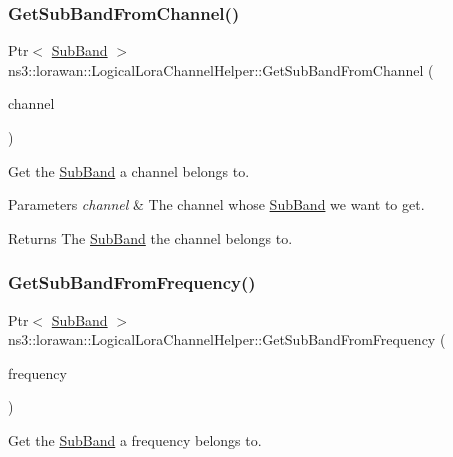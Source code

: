 \subsubsection{\texorpdfstring{Get\+Sub\+Band\+From\+Channel()}{GetSubBandFromChannel()}}
{\footnotesize\ttfamily Ptr$<$ \hyperlink{classns3_1_1lorawan_1_1SubBand}{Sub\+Band} $>$ ns3\+::lorawan\+::\+Logical\+Lora\+Channel\+Helper\+::\+Get\+Sub\+Band\+From\+Channel (\begin{DoxyParamCaption}\item[{Ptr$<$ \hyperlink{classns3_1_1lorawan_1_1LogicalLoraChannel}{Logical\+Lora\+Channel} $>$}]{channel }\end{DoxyParamCaption})}

Get the \hyperlink{classns3_1_1lorawan_1_1SubBand}{Sub\+Band} a channel belongs to.


\begin{DoxyParams}{Parameters}
{\em channel} & The channel whose \hyperlink{classns3_1_1lorawan_1_1SubBand}{Sub\+Band} we want to get. \\
\hline
\end{DoxyParams}
\begin{DoxyReturn}{Returns}
The \hyperlink{classns3_1_1lorawan_1_1SubBand}{Sub\+Band} the channel belongs to. 
\end{DoxyReturn}
\mbox{\label{classns3_1_1lorawan_1_1LogicalLoraChannelHelper_a204fd2ee7705861c0d1109ab868eb126}} 
\subsubsection{\texorpdfstring{Get\+Sub\+Band\+From\+Frequency()}{GetSubBandFromFrequency()}}
{\footnotesize\ttfamily Ptr$<$ \hyperlink{classns3_1_1lorawan_1_1SubBand}{Sub\+Band} $>$ ns3\+::lorawan\+::\+Logical\+Lora\+Channel\+Helper\+::\+Get\+Sub\+Band\+From\+Frequency (\begin{DoxyParamCaption}\item[{double}]{frequency }\end{DoxyParamCaption})}

Get the \hyperlink{classns3_1_1lorawan_1_1SubBand}{Sub\+Band} a frequency belongs to.


